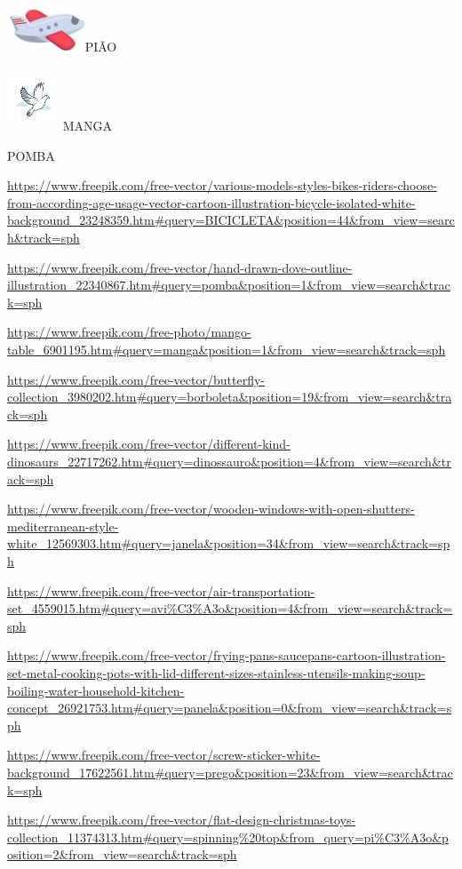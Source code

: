 \includegraphics[width=0.91319in,height=0.52292in]{media/image65.png}PIÃO

\includegraphics[width=0.65385in,height=0.73262in]{media/image66.png}MANGA

POMBA

\url{https://www.freepik.com/free-vector/various-models-styles-bikes-riders-choose-from-according-age-usage-vector-cartoon-illustration-bicycle-isolated-white-background_23248359.htm\#query=BICICLETA\&position=44\&from_view=search\&track=sph}

\url{https://www.freepik.com/free-vector/hand-drawn-dove-outline-illustration_22340867.htm\#query=pomba\&position=1\&from_view=search\&track=sph}

\url{https://www.freepik.com/free-photo/mango-table_6901195.htm\#query=manga\&position=1\&from_view=search\&track=sph}

\url{https://www.freepik.com/free-vector/butterfly-collection_3980202.htm\#query=borboleta\&position=19\&from_view=search\&track=sph}

\url{https://www.freepik.com/free-vector/different-kind-dinosaurs_22717262.htm\#query=dinossauro\&position=4\&from_view=search\&track=sph}

\url{https://www.freepik.com/free-vector/wooden-windows-with-open-shutters-mediterranean-style-white_12569303.htm\#query=janela\&position=34\&from_view=search\&track=sph}

\url{https://www.freepik.com/free-vector/air-transportation-set_4559015.htm\#query=avi\%C3\%A3o\&position=4\&from_view=search\&track=sph}

\url{https://www.freepik.com/free-vector/frying-pans-saucepans-cartoon-illustration-set-metal-cooking-pots-with-lid-different-sizes-stainless-utensils-making-soup-boiling-water-household-kitchen-concept_26921753.htm\#query=panela\&position=0\&from_view=search\&track=sph}

\url{https://www.freepik.com/free-vector/screw-sticker-white-background_17622561.htm\#query=prego\&position=23\&from_view=search\&track=sph}

\url{https://www.freepik.com/free-vector/flat-design-christmas-toys-collection_11374313.htm\#query=spinning\%20top\&from_query=pi\%C3\%A3o\&position=2\&from_view=search\&track=sph}

